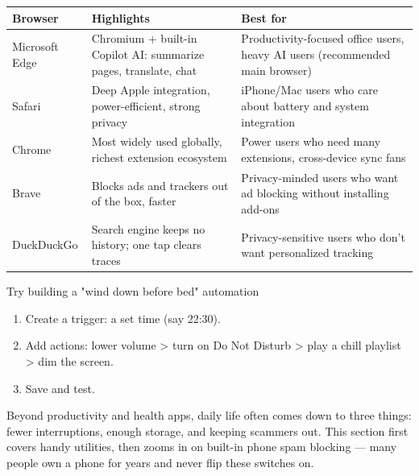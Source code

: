 
\begin{center}
\begin{tabularx}{\linewidth}{|X|X|X|}
\hline
\textbf{Browser} & \textbf{Highlights} & \textbf{Best for} \tabularnewline
\hline
Microsoft Edge & Chromium + built-in Copilot AI: summarize pages, translate, chat & Productivity-focused office users, heavy AI users (recommended main browser) \tabularnewline
Safari & Deep Apple integration, power-efficient, strong privacy & iPhone/Mac users who care about battery and system integration \tabularnewline
Chrome & Most widely used globally, richest extension ecosystem & Power users who need many extensions, cross-device sync fans \tabularnewline
Brave & Blocks ads and trackers out of the box, faster & Privacy-minded users who want ad blocking without installing add-ons \tabularnewline
DuckDuckGo & Search engine keeps no history; one tap clears traces & Privacy-sensitive users who don't want personalized tracking \tabularnewline
\hline
\end{tabularx}
\end{center}

\begin{tcbpractice}{Try building a "wind down before bed" automation}
\begin{enumerate}
  \item Create a trigger: a set time (say 22:30).
  \item Add actions: lower volume > turn on Do Not Disturb > play a chill playlist > dim the screen.
  \item Save and test.
\end{enumerate}

\end{tcbpractice}


Beyond productivity and health apps, daily life often comes down to three things: fewer interruptions, enough storage, and keeping scammers out. This section first covers handy utilities, then zooms in on built-in phone spam blocking — many people own a phone for years and never flip these switches on.


